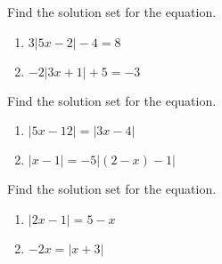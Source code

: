 \begin{exercise}

Find the solution set for the equation.

\begin{enumerate}
\item
  \(3|5x - 2|-4 = 8\)
\item
  \(-2|3x + 1| + 5= -3\)
\end{enumerate}

\end{exercise}

\begin{exercise}

Find the solution set for the equation.

\begin{enumerate}
\item
  \(|5x-12|=|3x-4|\)
\item
  \(|x-1|=-5|(2-x)-1|\)
\end{enumerate}

\end{exercise}

\begin{exercise}

Find the solution set for the equation.

\begin{enumerate}
\item
  \(|2x-1|=5-x\)
\item
  \(-2x=|x+3|\)
\end{enumerate}

\end{exercise}
